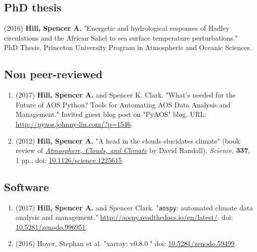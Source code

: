 \documentclass[12pt,letterpaper]{shillcv}
\begin{document}
\subsection*{PhD thesis}
\label{sec:orgc035039}
(2016) \textbf{Hill, Spencer A.} "Energetic and hydrological responses of Hadley
circulations and the African Sahel to sea surface temperature perturbations."
PhD Thesis, Princeton University Program in Atmospheric and Oceanic Sciences.
\subsection*{Non peer-reviewed}
\label{sec:org3f4ce18}
\begin{enumerate}
\item (2017) \textbf{Hill, Spencer A.} and Spencer K. Clark.  "What’s needed for the Future
of AOS Python? Tools for Automating AOS Data Analysis and Management."
Invited guest blog post on "PyAOS" blog.  URL:
\url{http://pyaos.johnny-lin.com/?p=1546}.
\item (2012) \textbf{Hill, Spencer A.}  "A head in the clouds elucidates climate" (book
review of \href{http://press.princeton.edu/titles/9773.html}{\emph{Atmosphere, Clouds, and Climate}} by David Randall). \emph{Science}, \textbf{337},
1 pp., doi: \href{http://dx.doi.org/10.1126/science.1225615}{10.1126/science.1225615}.
\end{enumerate}
\subsection*{Software}
\label{sec:org829b0f8}
\begin{enumerate}
\item (2017) \textbf{Hill, Spencer A.} and Spencer Clark.  "\texttt{aospy}: automated climate data
analysis and management."  \url{http://aospy.readthedocs.io/en/latest/}.  doi:
\href{https://doi.org/10.5281/zenodo.996951}{10.5281/zenodo.996951}.
\item (2016) Hoyer, Stephan et al.  "xarray: v0.8.0."  doi: \href{https://doi.org/10.5281/zenodo.59499}{10.5281/zenodo.59499}.
\end{enumerate}
\end{document}
